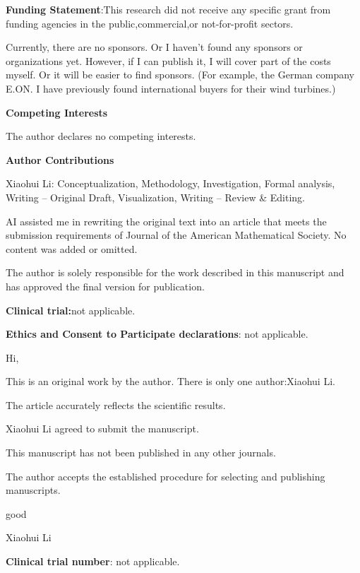 \documentclass[11pt,a4paper]{article}
\begin{document}
 \textbf{\textbf{Funding Statement}}:This research did not receive any specific grant from funding agencies in the public,commercial,or not-for-profit sectors.

Currently, there are no sponsors. Or I haven't found any sponsors or organizations yet. However, if I can publish it, I will cover part of the costs myself. Or it will be easier to find sponsors. (For example, the German company E.ON. I have previously found international buyers for their wind turbines.)

 \textbf{\textbf{Competing Interests}}

The author declares no competing interests.

 \textbf{\textbf{Author Contributions}}

Xiaohui Li: Conceptualization, Methodology, Investigation, Formal analysis, Writing – Original Draft, Visualization, Writing – Review \& Editing.

AI assisted me in rewriting the original text into an article that meets the submission requirements of Journal of the American Mathematical Society. No content was added or omitted.

 The author is solely responsible for the work described in this manuscript and has approved the final version for publication.

 \textbf{\textbf{Clinical trial:}}not applicable.

 \textbf{\textbf{Ethics and Consent to Participate declarations}}: not applicable.

 Hi,

This is an original work by the author. There is only one author:Xiaohui Li.

The article accurately reflects the scientific results.

Xiaohui Li agreed to submit the manuscript.

This manuscript has not been published in any other journals.

The author accepts the established procedure for selecting and publishing manuscripts.

good

Xiaohui Li



 \textbf{\textbf{Clinical trial number}}: not applicable.
\end{document}
